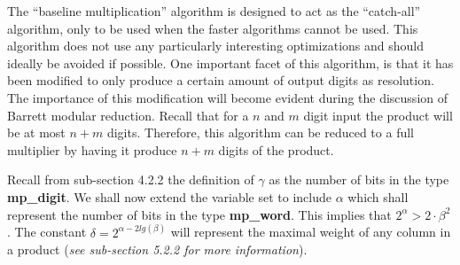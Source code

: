 \documentclass[b5paper]{book}
\begin{document}
The ``baseline multiplication'' algorithm is designed to act as the ``catch-all'' algorithm, only to be used when the faster algorithms cannot be 
used.  This algorithm does not use any particularly interesting optimizations and should ideally be avoided if possible.    One important 
facet of this algorithm, is that it has been modified to only produce a certain amount of output digits as resolution.  The importance of this 
modification will become evident during the discussion of Barrett modular reduction.  Recall that for a $n$ and $m$ digit input the product 
will be at most $n + m$ digits.  Therefore, this algorithm can be reduced to a full multiplier by having it produce $n + m$ digits of the product.  

Recall from sub-section 4.2.2 the definition of $\gamma$ as the number of bits in the type \textbf{mp\_digit}.  We shall now extend the variable set to 
include $\alpha$ which shall represent the number of bits in the type \textbf{mp\_word}.  This implies that $2^{\alpha} > 2 \cdot \beta^2$.  The 
constant $\delta = 2^{\alpha - 2lg(\beta)}$ will represent the maximal weight of any column in a product (\textit{see sub-section 5.2.2 for more information}).
\end{document}
